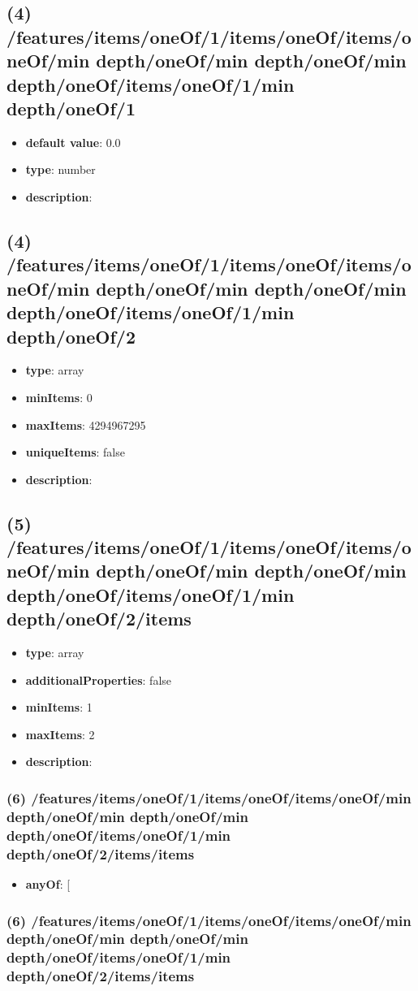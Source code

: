 \subsection{(4) /features/items/oneOf/1/items/oneOf/items/oneOf/min depth/oneOf/min depth/oneOf/min depth/oneOf/items/oneOf/1/min depth/oneOf/1}
\begin{itemize}[leftmargin=4em]\item {\bf default value}: 0.0
\item {\bf type}: number
\item {\bf description}: 
\end{itemize}\subsection{(4) /features/items/oneOf/1/items/oneOf/items/oneOf/min depth/oneOf/min depth/oneOf/min depth/oneOf/items/oneOf/1/min depth/oneOf/2}
\begin{itemize}[leftmargin=4em]\item {\bf type}: array
\item {\bf minItems}: 0
\item {\bf maxItems}: 4294967295
\item {\bf uniqueItems}: false
\item {\bf description}: 
\end{itemize}\subsection{(5) /features/items/oneOf/1/items/oneOf/items/oneOf/min depth/oneOf/min depth/oneOf/min depth/oneOf/items/oneOf/1/min depth/oneOf/2/items}
\begin{itemize}[leftmargin=5em]\item {\bf type}: array
\item {\bf additionalProperties}: false
\item {\bf minItems}: 1
\item {\bf maxItems}: 2
\item {\bf description}: 
\end{itemize}\subsubsection{(6) /features/items/oneOf/1/items/oneOf/items/oneOf/min depth/oneOf/min depth/oneOf/min depth/oneOf/items/oneOf/1/min depth/oneOf/2/items/items}
\begin{itemize}[leftmargin=6em]\item {\bf anyOf}: [\end{itemize}\subsubsection{(6) /features/items/oneOf/1/items/oneOf/items/oneOf/min depth/oneOf/min depth/oneOf/min depth/oneOf/items/oneOf/1/min depth/oneOf/2/items/items}
